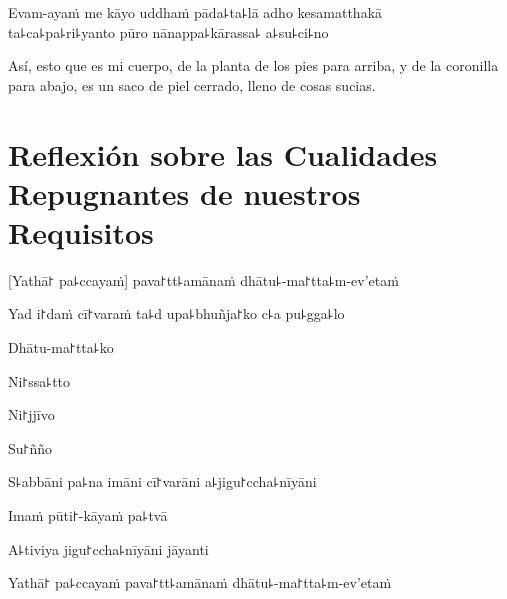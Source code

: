 Evam-ayaṁ me kāyo uddhaṁ pāda꜕ta꜕lā adho kesamatthakā\\
ta꜕ca꜕pa꜕ri꜕yanto pūro nānappa꜕kārassa꜕ a꜕su꜕ci꜕no

\begin{english}
  Así, esto que es mi cuerpo, de la planta de los pies para arriba, y de la coronilla para abajo, es un saco de piel cerrado, lleno de cosas sucias.
\end{english}

\clearpage


\chapter[Cualidades Repugnantes de nuestros Requisitos]{Reflexión sobre las Cualidades Repugnantes de nuestros Requisitos}


\begin{leader}
\end{leader}

[Yathā꜓ pa꜕ccayaṁ] pava꜓tt꜕amānaṁ dhātu꜕-ma꜓tta꜕m-ev'etaṁ


Yad i꜓daṁ cī꜓varaṁ ta꜕d upa꜕bhuñja꜓ko c꜕a pu꜕gga꜕lo


Dhātu-ma꜓tta꜕ko


Ni꜓ssa꜕tto


Ni꜓jjīvo


Su꜓ñño


S꜕abbāni pa꜕na imāni cī꜓varāni a꜕jigu꜓ccha꜕nīyāni


\clearpage

Imaṁ pūti꜓-kāyaṁ pa꜕tvā


A꜕tiviya jigu꜓ccha꜕nīyāni jāyanti


Yathā꜓ pa꜕ccayaṁ pava꜓tt꜕amānaṁ dhātu꜕-ma꜓tta꜕m-ev'etaṁ

